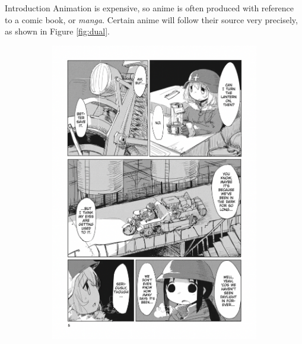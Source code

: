 \documentclass{beamer}                             %
\begin{document}
\begin{frame}
\begin{columns}
\begin{column}{0.33\textwidth}
\begin{block}{Introduction}
          Animation is expensive, so anime is often produced with reference
          to a comic book, or \textit{manga}. Certain anime will follow their
          source very precisely, as shown in Figure \autoref{fig:dual}.

          \begin{figure}[h!]
              \centering
              \begin{subfigure}[h]{0.49 \textwidth}
                \includegraphics[scale=0.3,trim={60px 50px 60px 60px},clip]{page}
              \end{subfigure}
              \hfill
              \begin{subfigure}[h]{0.49 \textwidth}

\end{subfigure}
\end{figure}
\end{block}
\end{column}
\end{columns}
\end{frame}
\end{document}
